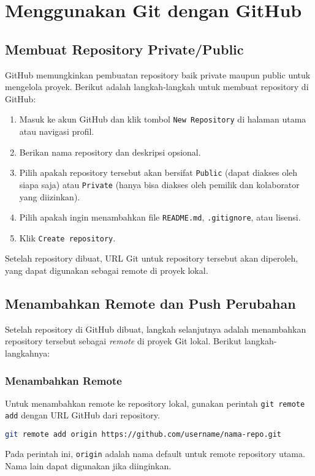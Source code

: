 \chapter{Menggunakan Git dengan GitHub}

\section{Membuat Repository Private/Public}
GitHub memungkinkan pembuatan repository baik private maupun public untuk mengelola proyek. Berikut adalah langkah-langkah untuk membuat repository di GitHub:
\begin{enumerate}
	\item Masuk ke akun GitHub dan klik tombol \texttt{New Repository} di halaman utama atau navigasi profil.
	\item Berikan nama repository dan deskripsi opsional.
	\item Pilih apakah repository tersebut akan bersifat \texttt{Public} (dapat diakses oleh siapa saja) atau \texttt{Private} (hanya bisa diakses oleh pemilik dan kolaborator yang diizinkan).
	\item Pilih apakah ingin menambahkan file \texttt{README.md}, \texttt{.gitignore}, atau lisensi.
	\item Klik \texttt{Create repository}.
\end{enumerate}

Setelah repository dibuat, URL Git untuk repository tersebut akan diperoleh, yang dapat digunakan sebagai remote di proyek lokal.

\section{Menambahkan Remote dan Push Perubahan}
Setelah repository di GitHub dibuat, langkah selanjutnya adalah menambahkan repository tersebut sebagai \textit{remote} di proyek Git lokal. Berikut langkah-langkahnya:

\subsection{Menambahkan Remote}
Untuk menambahkan remote ke repository lokal, gunakan perintah \texttt{git remote add} dengan URL GitHub dari repository.
\begin{lstlisting}[language=bash]
	git remote add origin https://github.com/username/nama-repo.git
\end{lstlisting}
Pada perintah ini, \texttt{origin} adalah nama default untuk remote repository utama. Nama lain dapat digunakan jika diinginkan.

